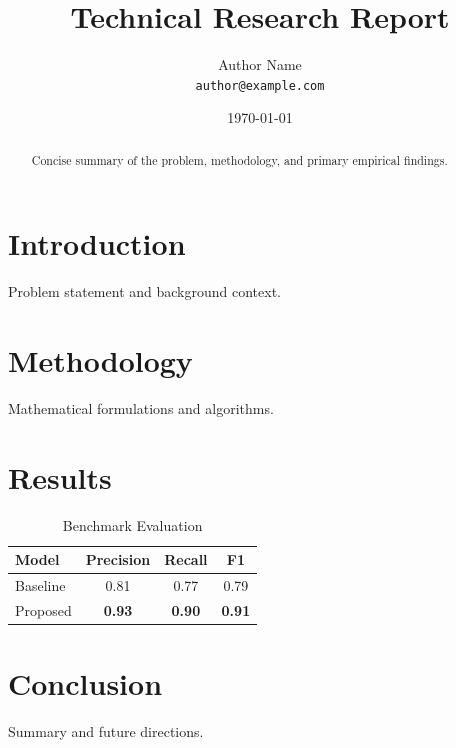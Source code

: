\documentclass[11pt,a4paper]{article}
\title{Technical Research Report}
\author{Author Name \\ \texttt{author@example.com}}
\date{\today}
\begin{document}
\maketitle

\begin{abstract}
Concise summary of the problem, methodology, and primary empirical findings.
\end{abstract}

\section{Introduction}
Problem statement and background context.

\section{Methodology}
Mathematical formulations and algorithms.

\section{Results}
\begin{table}[htbp]
\centering
\caption{Benchmark Evaluation}
\begin{tabular}{lccc}
\toprule
\textbf{Model} & \textbf{Precision} & \textbf{Recall} & \textbf{F1} \\
\midrule
Baseline & 0.81 & 0.77 & 0.79 \\
Proposed & \textbf{0.93} & \textbf{0.90} & \textbf{0.91} \\
\bottomrule
\end{tabular}
\end{table}

\section{Conclusion}
Summary and future directions.
\end{document}
